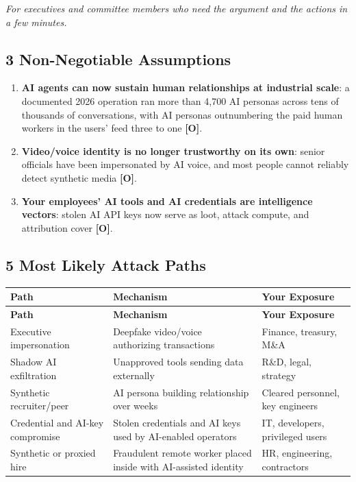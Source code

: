 \documentclass[11pt,letterpaper]{article}
\begin{document}
\textit{For executives and committee members who need the argument and the actions in a few minutes.}

\subsection*{3 Non-Negotiable Assumptions}

\begin{enumerate}
  \item \textbf{AI agents can now sustain human relationships at industrial scale}: a documented 2026 operation ran more than 4,700 AI personas across tens of thousands of conversations, with AI personas outnumbering the paid human workers in the users' feed three to one \textbf{[O]}.
  \item \textbf{Video/voice identity is no longer trustworthy on its own}: senior officials have been impersonated by AI voice, and most people cannot reliably detect synthetic media \textbf{[O]}.
  \item \textbf{Your employees' AI tools and AI credentials are intelligence vectors}: stolen AI API keys now serve as loot, attack compute, and attribution cover \textbf{[O]}.
\end{enumerate}

\subsection*{5 Most Likely Attack Paths}

{\small
\begin{longtable}{L{3.5cm}L{5cm}L{4cm}}
\toprule
\textbf{Path} & \textbf{Mechanism} & \textbf{Your Exposure} \\
\midrule
\endfirsthead
\toprule
\textbf{Path} & \textbf{Mechanism} & \textbf{Your Exposure} \\
\midrule
\endhead
Executive impersonation & Deepfake video/voice authorizing transactions & Finance, treasury, M\&A \\*
Shadow AI exfiltration & Unapproved tools sending data externally & R\&D, legal, strategy \\
Synthetic recruiter/peer & AI persona building relationship over weeks & Cleared personnel, key engineers \\
Credential and AI-key compromise & Stolen credentials and AI keys used by AI-enabled operators & IT, developers, privileged users \\*
Synthetic or proxied hire & Fraudulent remote worker placed inside with AI-assisted identity & HR, engineering, contractors \\
\bottomrule
\end{longtable}}
\end{document}
